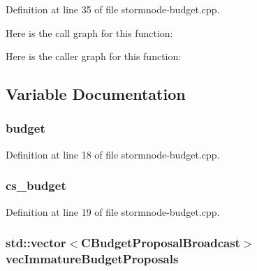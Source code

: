 Definition at line 35 of file stormnode-\/budget.\+cpp.



Here is the call graph for this function\+:




Here is the caller graph for this function\+:




\subsection{Variable Documentation}
\hypertarget{stormnode-budget_8h_ad9842d355854ad5602728a96cf684706}{}
\subsubsection[{budget}]{ budget}\label{stormnode-budget_8h_ad9842d355854ad5602728a96cf684706}


Definition at line 18 of file stormnode-\/budget.\+cpp.

\hypertarget{stormnode-budget_8h_a2343791d00e01ac44a133ed313432d92}{}
\subsubsection[{cs\+\_\+budget}]{ cs\+\_\+budget}\label{stormnode-budget_8h_a2343791d00e01ac44a133ed313432d92}


Definition at line 19 of file stormnode-\/budget.\+cpp.

\hypertarget{stormnode-budget_8h_ad799c6b69cfbea7cdd37386b6b2a1429}{}
\subsubsection[{vec\+Immature\+Budget\+Proposals}]{\setlength{\rightskip}{0pt plus 5cm}std\+::vector$<${\bf C\+Budget\+Proposal\+Broadcast}$>$ vec\+Immature\+Budget\+Proposals}\label{stormnode-budget_8h_ad799c6b69cfbea7cdd37386b6b2a1429}


